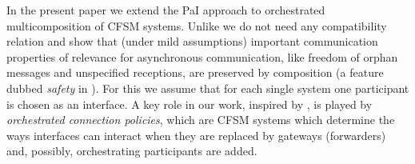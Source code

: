 In the present paper we  extend  the PaI approach to orchestrated multicomposition
 of CFSM systems.
Unlike \cite{BdLH19} we do not need 
any compatibility relation and show that  (under mild assumptions) important 
communication properties of relevance for asynchronous communication, like freedom of orphan messages and unspecified receptions,  are preserved by composition (a feature dubbed 
{\em safety\/} in \cite{BDGY23}).
 For this we assume that 
for each single system one participant is chosen as an interface. 
A key role in our work, inspired by  \cite{BDGY23}, is played by
{\em orchestrated connection policies}, which are CFSM systems which determine the ways 
 interfaces can interact when they are replaced by gateways (forwarders) and, possibly, orchestrating participants are added. 



 
 


